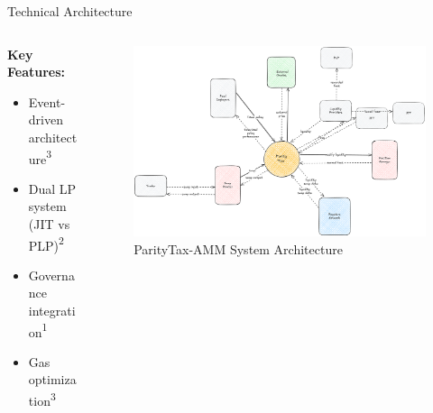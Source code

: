 \documentclass[aspectratio=169]{beamer}
\newcommand{\citeaquilina}{\textcolor{parityblue}{\textsuperscript{1}}}
\newcommand{\citecapponi}{\textcolor{paritygreen}{\textsuperscript{2}}}
\newcommand{\citema}{\textcolor{parityorange}{\textsuperscript{3}}}
\begin{document}
\begin{frame}{Technical Architecture}
\begin{columns}
\begin{column}{0.45\textwidth}
            \vspace{0.3cm}
            \textbf{Key Features:}
            \begin{itemize}
                \item \footnotesize Event-driven architecture\citema
                \item \footnotesize Dual LP system (JIT vs PLP)\citecapponi
                \item \footnotesize Governance integration\citeaquilina
                \item \footnotesize Gas optimization\citema
            \end{itemize}
        \end{column}
        \begin{column}{0.55\textwidth}  %
            \begin{figure}
                \centering
                \includegraphics[width=\linewidth]{contextDiagram.excalidraw.png}  %
                \caption{ParityTax-AMM System Architecture}
                \label{fig:system_architecture}
            \end{figure}
        \end{column}
    \end{columns}
\end{frame}
\end{document}
